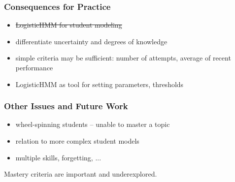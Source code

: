 \documentclass[bigger]{beamer}
\begin{document}
\begin{frame}
  \frametitle{Consequences for Practice}

  \begin{itemize}
  \item \sout{LogisticHMM for student modeling}
  \item differentiate uncertainty and degrees of knowledge
  \item simple criteria may be sufficient: number of attempts, average of
    recent performance
  \item LogisticHMM as tool for setting parameters, thresholds
  \end{itemize}
\end{frame}

\begin{frame}
  \frametitle{Other Issues and Future Work}

  \begin{itemize}
  \item wheel-spinning students -- unable to master a topic
  \item relation to more complex student models
  \item multiple skills, forgetting, ...
  \end{itemize}

  \bigskip

  \begin{block}{}
  \alert{Mastery criteria are important and underexplored.}
  \end{block}

\end{frame}
\end{document}
